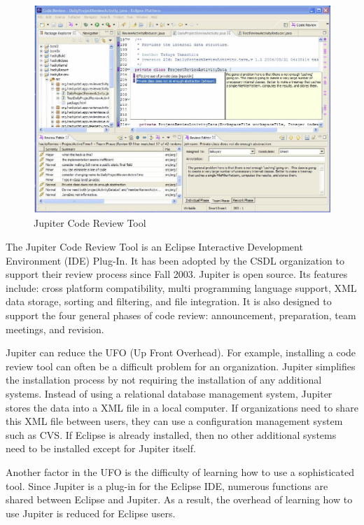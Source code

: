 \begin{figure}[htbp]
  \centering
  \includegraphics{images/fig1-5.eps}
  \caption{Jupiter Code Review Tool}
  \label{fig1-5}
\end{figure}

The Jupiter Code Review Tool is an Eclipse Interactive Development Environment (IDE) Plug-In. It has been adopted by the CSDL organization to support their review process since Fall 2003. Jupiter is open source. Its features include: cross platform compatibility, multi programming language support, XML data storage, sorting and filtering, and file integration.  It is also designed to support the four general phases of code review: announcement, preparation, team meetings, and revision.

Jupiter can reduce the UFO (Up Front Overhead). For example, installing a code review tool can often be a difficult problem for an organization. Jupiter simplifies the installation process by not requiring the installation of any additional systems.  Instead of using a relational database management system, Jupiter stores the data into a XML file in a local computer. If organizations need to share this XML file between users, they can use a configuration management system such as CVS. If Eclipse is already installed, then no other additional systems need to be installed except for Jupiter itself.

Another factor in the UFO is the difficulty of learning how to use a sophisticated tool. Since Jupiter is a plug-in for the Eclipse IDE, numerous functions are shared between Eclipse and Jupiter. As a result, the overhead of learning how to use Jupiter is reduced for Eclipse users.

